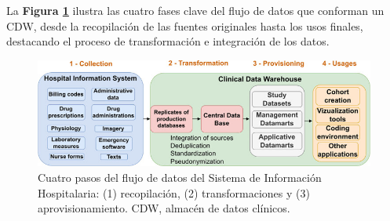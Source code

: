 \documentclass[12pt, a4paper, twoside]{article}
\begin{document}
	La \textbf{Figura \ref{fig:Flujo}} ilustra las cuatro fases clave del flujo de datos que conforman un CDW, desde la recopilación de las fuentes originales hasta los usos finales, destacando el proceso de transformación e integración de los datos.
	
	\begin{figure}[h!]
		\includegraphics[width=1\textwidth]{image/Flujo.jpg}
		\caption{Cuatro pasos del flujo de datos del Sistema de Información Hospitalaria: (1) recopilación, (2) transformaciones y (3) aprovisionamiento. CDW, almacén de datos clínicos.\cite{doutreligne2023}}
		\label{fig:Flujo}
	\end{figure}
	
\end{document}
